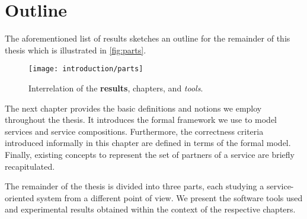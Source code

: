 \section{Outline}

The aforementioned list of results sketches an outline for the remainder of this thesis which is illustrated in \autoref{fig:parts}.

\medskip

\begin{figure}
\centering
\texttt{[image: introduction/parts]}
\caption{Interrelation of the \textbf{results},  chapters, and \emph{tools}.}\label{fig:parts}
\end{figure}

The next chapter provides the basic definitions and notions we employ throughout the thesis. It introduces the formal framework we use to model services and service compositions. Furthermore, the correctness criteria introduced informally in this chapter are defined in terms of the formal model. Finally, existing concepts to represent the set of partners of a service are briefly recapitulated.

\medskip

The remainder of the thesis is divided into three parts, each studying a service-oriented system from a different point of view. We present the software tools used and experimental results obtained within the context of the respective chapters.

